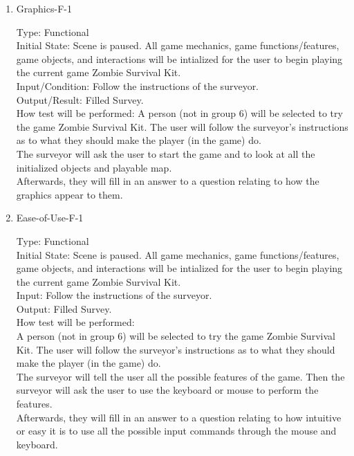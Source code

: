 \documentclass[12pt, titlepage]{article}
\begin{document}
\begin{enumerate}
	
	\item{Graphics-F-1\\}
	
	Type: Functional \\
	
	Initial State: Scene is paused. All game mechanics, game functions/features, game objects, and interactions will be intialized for the user to begin playing the current game Zombie Survival Kit.\\
	
	Input/Condition: Follow the instructions of the surveyor. \\
	
	Output/Result: Filled Survey. \\
	
	How test will be performed: A person (not in group 6) will be selected to try the game Zombie Survival Kit. The user will follow the surveyor's instructions as to what they should make the player (in the game) do. \\
	The surveyor will ask the user to start the game and to look at all the initialized objects and playable map.\\
	Afterwards, they will fill in an answer to a question relating to how the graphics appear to them.
	
	\item{Ease-of-Use-F-1\\}
	
	Type: Functional \\
	
	Initial State: Scene is paused. All game mechanics, game functions/features, game objects, and interactions will be intialized for the user to begin playing the current game Zombie Survival Kit. \\
	
	Input: Follow the instructions of the surveyor. \\
	
	Output: Filled Survey. \\
	
	How test will be performed:\\ A person (not in group 6) will be selected to try the game Zombie Survival Kit. The user will follow the surveyor's instructions as to what they should make the player (in the game) do.\\  
	The surveyor will tell the user all the possible features of the game. Then the surveyor will ask the user to use the keyboard or mouse to perform the features. \\
	Afterwards, they will fill in an answer to a question relating to how intuitive or easy it is to use all the possible input commands through the mouse and keyboard.\\
	

\end{enumerate}
\end{document}
